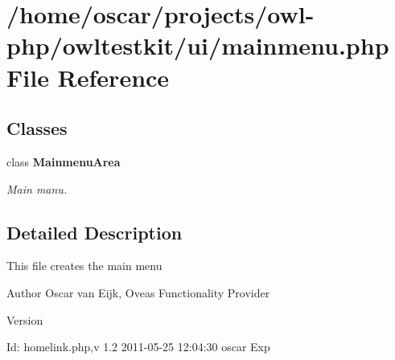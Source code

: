 \section{/home/oscar/projects/owl-\/php/owltestkit/ui/mainmenu.php File Reference}
\label{mainmenu_8php}
\subsection*{Classes}
\begin{DoxyCompactItemize}
\item 
class {\bf MainmenuArea}
\begin{DoxyCompactList}\small\item\em Main manu. \end{DoxyCompactList}\end{DoxyCompactItemize}


\subsection{Detailed Description}
This file creates the main menu \begin{DoxyAuthor}{Author}
Oscar van Eijk, Oveas Functionality Provider 
\end{DoxyAuthor}
\begin{DoxyVersion}{Version}

\end{DoxyVersion}
\begin{DoxyParagraph}{Id:}
homelink.php,v 1.2 2011-\/05-\/25 12:04:30 oscar Exp 
\end{DoxyParagraph}
